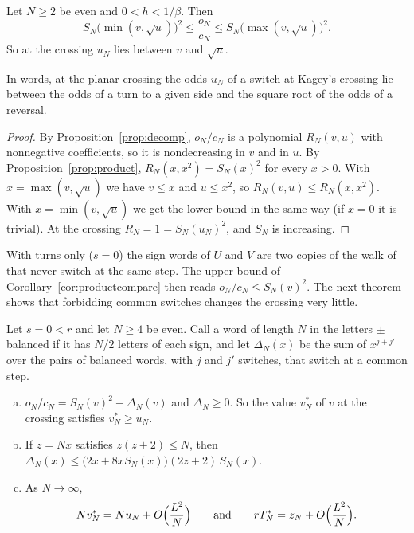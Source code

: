 \begin{corollary}\label{cor:productcompare}
Let $N\ge2$ be even and $0<h<1/\beta$. Then
\[
 S_N\bigl(\min(v,\sqrt u)\bigr)^2\le\frac{o_N}{c_N}\le S_N\bigl(\max(v,\sqrt u)\bigr)^2 .
\]
So at the crossing $u_N$ lies between $v$ and $\sqrt u$.
\end{corollary}

In words, at the planar crossing the odds $u_N$ of a switch at Kagey's crossing lie between the
odds of a turn to a given side and the square root of the odds of a reversal.

\begin{proof}
By Proposition~\ref{prop:decomp}, $o_N/c_N$ is a polynomial $R_N(v,u)$ with nonnegative
coefficients, so it is nondecreasing in $v$ and in $u$. By Proposition~\ref{prop:product},
$R_N(x,x^2)=S_N(x)^2$ for every $x>0$. With $x=\max(v,\sqrt u)$ we have $v\le x$ and $u\le x^2$, so
$R_N(v,u)\le R_N(x,x^2)$. With $x=\min(v,\sqrt u)$ we get the lower bound in the same way (if $x=0$
it is trivial). At the crossing $R_N=1=S_N(u_N)^2$, and $S_N$ is increasing.
\end{proof}

With turns only ($s=0$) the sign words of $U$ and $V$ are two copies of the walk of~\cite{paperA}
that never switch at the same step. The upper bound of Corollary~\ref{cor:productcompare} then
reads $o_N/c_N\le S_N(v)^2$. The next theorem shows that forbidding common switches changes the
crossing very little.

\begin{theorem}\label{thm:pureturns}
Let $s=0<r$ and let $N\ge4$ be even. Call a word of length $N$ in the letters $\pm$ balanced if it
has $N/2$ letters of each sign, and let $\Delta_N(x)$ be the sum of $x^{j+j'}$ over the pairs of
balanced words, with $j$ and $j'$ switches, that switch at a common step.
\begin{enumerate}[(a)]
\item $o_N/c_N=S_N(v)^2-\Delta_N(v)$ and $\Delta_N\ge0$. So the value $v^*_N$ of $v$ at the
crossing satisfies $v^*_N\ge u_N$.
\item If $z=Nx$ satisfies $z(z+2)\le N$, then
$\Delta_N(x)\le\bigl(2x+8xS_N(x)\bigr)(2z+2)\,S_N(x)$.
\item As $N\to\infty$,
\[
 Nv^*_N=Nu_N+O\Bigl(\frac{L^2}N\Bigr)\qquad\text{and}\qquad
 rT^*_N=z_N+O\Bigl(\frac{L^2}N\Bigr).
\]
\end{enumerate}
\end{theorem}

